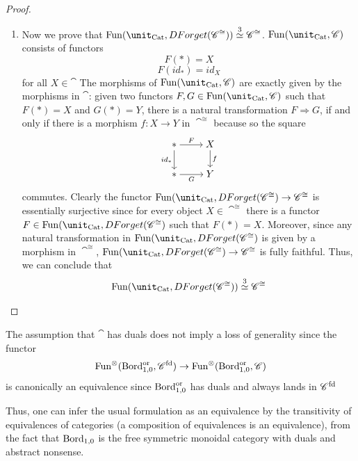 \begin{proof}
\begin{enumerate}
\item Now we prove that $\Fun(\unit_{\Cat},DForget(\cat^{\cong}))\overset{3}{\simeq} \cat^{\cong}$.
$\Fun(\unit_{\Cat},\cat)$ consists of functors $$F(\ast)=X$$ $$F(id_\ast)=id_X$$ for all $X\in\cat$
The morphisms of $\Fun(\unit_{\Cat},\cat)$ are exactly given by the morphisms in $\cat$:  given two functors
 $F,G\in\Fun(\unit_{\Cat},\cat)$ such that $F(\ast)=X$ and $G(\ast)=Y$,
 there is a natural transformation $F\Rightarrow G$, if and only if
there is a morphism $f:X\to Y$ in $\cat^{\cong}$ because so the square 
\[\begin{tikzcd}[cramped]
	\ast & X \\
	\ast & Y
	\arrow["{id_\ast}"', from=1-1, to=2-1]
	\arrow["F", from=1-1, to=1-2]
	\arrow["G"', from=2-1, to=2-2]
	\arrow["f", from=1-2, to=2-2]
\end{tikzcd}\]
commutes. Clearly the functor $\Fun(\unit_{\Cat},DForget(\cat^{\cong})\to \cat^{\cong}$ is essentially surjective
since for every object $X\in\cat^{\cong}$ there is a functor $F\in\Fun(\unit_{\Cat},DForget(\cat^{\cong})$ such that
$F(\ast)=X$. Moreover, since any natural transformation in $\Fun(\unit_{\Cat},DForget(\cat^{\cong})$ is given by
a morphism in $\cat^{\cong}$, $\Fun(\unit_{\Cat},DForget(\cat^{\cong})\to \cat^{\cong}$ is fully faithful.
Thus, we can conclude that 
$$\Fun(\unit_{\Cat},DForget(\cat^{\cong}))\overset{3}{\simeq} \cat^{\cong}$$
\end{enumerate}
\end{proof}

\begin{rem}
The assumption that $\cat$ has duals does not imply a loss of generality 
since the functor 
$$\operatorname{Fun}^{\otimes}(\operatorname{Bord}_{1,0}^{\operatorname{or}},\mathscr{C}^{\operatorname{fd}})\to\operatorname{Fun}^{\otimes}(\operatorname{Bord}_{1,0}^{\operatorname{or}},\mathscr{C})$$
is canonically an equivalence since $\operatorname{Bord}_{1,0}^{\operatorname{or}}$ has duals and always lands in
$\mathscr{C}^{\operatorname{fd}}$
\end{rem}


Thus, one can infer the usual formulation as an equivalence by the
transitivity of equivalences of categories (a composition of equivalences is an equivalence), from the fact that $\operatorname{Bord}_{1,0}$ is the free
symmetric monoidal category with duals and 
 abstract nonsense.